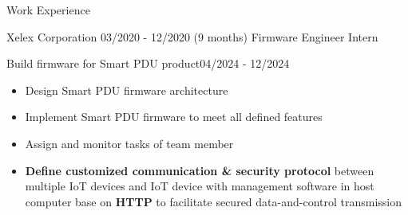 \documentclass{resume} %
\begin{document}
\begin{rSection}{Work Experience}
    \begin{rCompanySubsection} {Xelex Corporation} {03/2020 - 12/2020 (9 months)}
        {Firmware Engineer Intern}
        {}
        \begin{rProjectSubsubsectionV2}{Build firmware for Smart PDU product}{04/2024 - 12/2024}{
            \begin{itemize}
                \item Design Smart PDU firmware architecture
                \item Implement Smart PDU firmware to meet all defined features
                \item Assign and monitor tasks of team member
            \end{itemize}
        }{
            \begin{itemize}
                \item \textbf{Define customized communication \& security protocol} between multiple IoT devices and IoT device with management software in host computer base on \textbf{HTTP} to facilitate secured data-and-control transmission
            \end{itemize}
        }
        \end{rProjectSubsubsectionV2}
    \end{rCompanySubsection}
\end{rSection}
\end{document}
